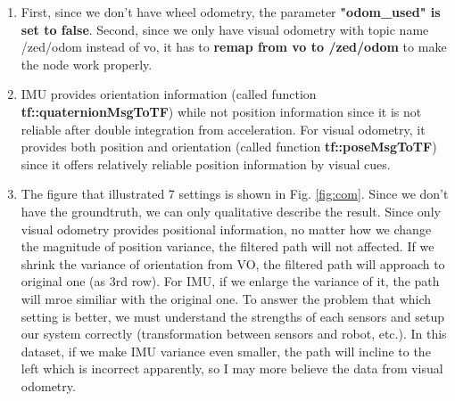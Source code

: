 \documentclass[12pt,a4paper]{article}
\begin{document}
\begin{enumerate}
  \item First, since we don't have wheel odometry, the parameter \textbf{"odom\_used" is set to false}. Second, since we only have visual odometry with topic name /zed/odom instead of vo, it has to \textbf{remap from vo to /zed/odom} to make the node work properly.
  \item IMU provides orientation information (called function \textbf{tf::quaternionMsgToTF}) while not position information since it is not reliable after double integration from acceleration. For visual odometry, it provides both position and orientation (called function \textbf{tf::poseMsgToTF}) since it offers relatively reliable position information by visual cues.
  \item The figure that illustrated 7 settings is shown in Fig. \ref{fig:com}. Since we don't have the groundtruth, we can only qualitative describe the result. Since only visual odometry provides positional information, no matter how we change the magnitude of position variance, the filtered path will not affected.%
If we shrink the variance of orientation from VO, the filtered path will approach to original one (as 3rd row). For IMU, if we enlarge the variance of it, the path will mroe similiar with the original one.  
To answer the problem that which setting is better, we must understand the strengths of each sensors and setup our system correctly (transformation between sensors and robot, etc.). In this dataset, if we make IMU variance even smaller, the path will incline to the left which is incorrect apparently, so I may more believe the data from visual odometry.
  

\end{enumerate}
\end{document}
